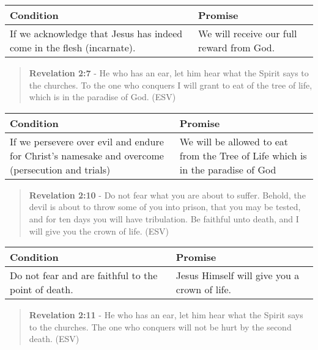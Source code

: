 \documentclass[11pt]{article}
\begin{document}
\begin{center}
\begin{tabular}{ll}
Condition & Promise\\[0pt]
\hline
If we acknowledge that Jesus has indeed come in the flesh (incarnate). & We will receive our full reward from God.\\[0pt]
\end{tabular}
\end{center}

\begin{quote}
\textbf{Revelation 2:7} - He who has an ear, let him hear what the Spirit says to the churches. To the one who conquers I will grant to eat of the tree of life, which is in the paradise of God. (ESV)
\end{quote}

\begin{center}
\begin{tabular}{ll}
Condition & Promise\\[0pt]
\hline
If we persevere over evil and endure for Christ's namesake and overcome (persecution and trials) & We will be allowed to eat from the Tree of Life which is in the paradise of God\\[0pt]
\end{tabular}
\end{center}

\begin{quote}
\textbf{Revelation 2:10} - Do not fear what you are about to suffer. Behold, the devil is about to throw some of you into prison, that you may be tested, and for ten days you will have tribulation. Be faithful unto death, and I will give you the crown of life. (ESV)
\end{quote}

\begin{center}
\begin{tabular}{ll}
Condition & Promise\\[0pt]
\hline
Do not fear and are faithful to the point of death. & Jesus Himself will give you a crown of life.\\[0pt]
\end{tabular}
\end{center}

\begin{quote}
\textbf{Revelation 2:11} - He who has an ear, let him hear what the Spirit says to the churches. The one who conquers will not be hurt by the second death. (ESV)
\end{quote}
\end{document}
